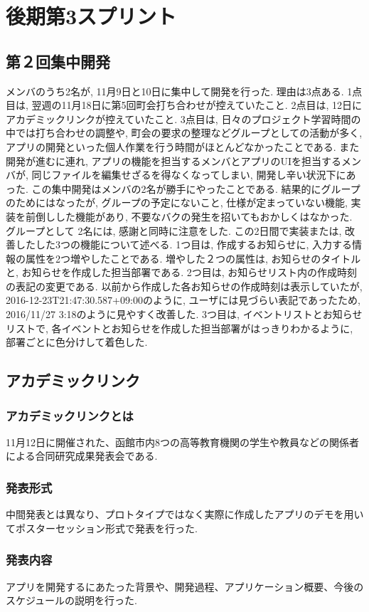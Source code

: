 \section{後期第3スプリント}
\subsection{第２回集中開発}
メンバのうち2名が, 11月9日と10日に集中して開発を行った. 理由は3点ある. 1点目は, 翌週の11月18日に第5回町会打ち合わせが控えていたこと.
2点目は, 12日にアカデミックリンクが控えていたこと. 3点目は, 日々のプロジェクト学習時間の中では打ち合わせの調整や, 町会の要求の整理などグループとしての活動が多く,
アプリの開発といった個人作業を行う時間がほとんどなかったことである. また開発が進むに連れ, アプリの機能を担当するメンバとアプリのUIを担当するメンバが, 同じファイルを編集せざるを得なくなってしまい,
開発し辛い状況下にあった. この集中開発はメンバの2名が勝手にやったことである. 結果的にグループのためにはなったが, グループの予定にないこと, 仕様が定まっていない機能, 実装を前倒しした機能があり,
不要なバクの発生を招いてもおかしくはなかった. グループとして 2名には, 感謝と同時に注意をした. この2日間で実装または, 改善したした3つの機能について述べる. 1つ目は, 作成するお知らせに,
入力する情報の属性を2つ増やしたことである. 増やした２つの属性は, お知らせのタイトルと, お知らせを作成した担当部署である. 2つ目は, お知らせリスト内の作成時刻の表記の変更である.
以前から作成した各お知らせの作成時刻は表示していたが, 2016-12-23T21:47:30.587+09:00のように, ユーザには見づらい表記であったため, 2016/11/27 3:18のように見やすく改善した.
3つ目は, イベントリストとお知らせリストで, 各イベントとお知らせを作成した担当部署がはっきりわかるように, 部署ごとに色分けして着色した.

\subsection{アカデミックリンク}
\subsubsection{アカデミックリンクとは}
11月12日に開催された、函館市内8つの高等教育機関の学生や教員などの関係者による合同研究成果発表会である.
\subsubsection{発表形式}
中間発表とは異なり、プロトタイプではなく実際に作成したアプリのデモを用いてポスターセッション形式で発表を行った.
\subsubsection{発表内容}
アプリを開発するにあたった背景や、開発過程、アプリケーション概要、今後のスケジュールの説明を行った.


